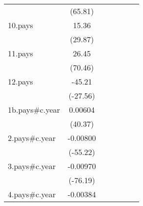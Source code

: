 {\begin{tabular}{l*{6}{c}}
                    &     (65.81)         &                     &                     &                     &                     &                     \\
[1em]
10.pays             &       15.36\sym{***}&                     &                     &                     &                     &                     \\
                    &     (29.87)         &                     &                     &                     &                     &                     \\
[1em]
11.pays             &       26.45\sym{***}&                     &                     &                     &                     &                     \\
                    &     (70.46)         &                     &                     &                     &                     &                     \\
[1em]
12.pays             &      -45.21\sym{***}&                     &                     &                     &                     &                     \\
                    &    (-27.56)         &                     &                     &                     &                     &                     \\
[1em]
1b.pays#c.year      &     0.00604\sym{***}&                     &                     &                     &                     &                     \\
                    &     (40.37)         &                     &                     &                     &                     &                     \\
[1em]
2.pays#c.year       &    -0.00800\sym{***}&                     &                     &                     &                     &                     \\
                    &    (-55.22)         &                     &                     &                     &                     &                     \\
[1em]
3.pays#c.year       &    -0.00970\sym{***}&                     &                     &                     &                     &                     \\
                    &    (-76.19)         &                     &                     &                     &                     &                     \\
[1em]
4.pays#c.year       &    -0.00384\sym{***}&                     &                     &                     &                     &                     \\

\end{tabular}}
